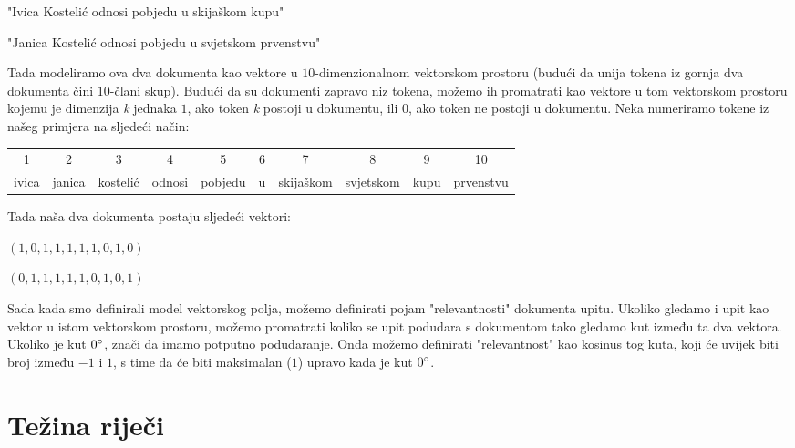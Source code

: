 \documentclass[a4paper,twoside,12pt]{memoir}
\begin{document}
\begin{compactenum}
  \item "Ivica Kostelić odnosi pobjedu u skijaškom kupu"
  \item "Janica Kostelić odnosi pobjedu u svjetskom prvenstvu"
\end{compactenum}

Tada modeliramo ova dva dokumenta kao vektore u $10$-dimenzionalnom vektorskom prostoru (budući da unija tokena iz gornja dva dokumenta čini $10$-člani skup). Budući da su dokumenti zapravo niz tokena, možemo ih promatrati kao vektore u tom vektorskom prostoru kojemu je dimenzija \textit{k} jednaka $1$, ako token \textit{k} postoji u dokumentu, ili $0$, ako token ne postoji u dokumentu. Neka numeriramo tokene iz našeg primjera na sljedeći način:

\begin{center}
  \begin{tabular}{@{\enspace}c@{\enspace}c@{\enspace}c@{\enspace}c@{\enspace}c@{\enspace}c@{\enspace}c@{\enspace}c@{\enspace}c@{\enspace}c@{\enspace}}
    1     & 2      & 3        & 4      & 5       & 6 & 7         & 8         & 9    & 10        \\
    ivica & janica & kostelić & odnosi & pobjedu & u & skijaškom & svjetskom & kupu & prvenstvu \\
  \end{tabular}
\end{center}

Tada naša dva dokumenta postaju sljedeći vektori:

\begin{compactenum}
  \item $(1,0,1,1,1,1,1,0,1,0)$
  \item $(0,1,1,1,1,1,0,1,0,1)$
\end{compactenum}

Sada kada smo definirali model vektorskog polja, možemo definirati pojam "relevantnosti" dokumenta upitu. Ukoliko gledamo i upit kao vektor u istom vektorskom prostoru, možemo promatrati koliko se upit podudara s dokumentom tako gledamo kut između ta dva vektora. Ukoliko je kut $0\degree$, znači da imamo potputno podudaranje. Onda možemo definirati "relevantnost" kao kosinus tog kuta, koji će uvijek biti broj između $-1$ i $1$, s time da će biti maksimalan ($1$) upravo kada je kut $0\degree$.

\section{Težina riječi} \label{tfidf}
\end{document}
